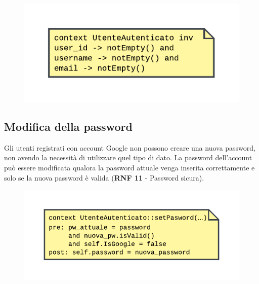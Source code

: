 \documentclass[11pt, a4paper]{article}
\theoremstyle{definition} %
\begin{document}
\begin{figure}[H]
\centering
\includegraphics[scale = 0.9]{materiale/ocl-utenteautenticato.pdf}
\end{figure}

\subsection{Modifica della password}
Gli utenti registrati con account Google non possono creare una nuova
password, non avendo la necessità di utilizzare quel tipo di dato.
La password dell'account può essere modificata qualora la password
attuale venga inserita correttamente e solo se la nuova password
è valida (\textbf{RNF 11} - Password sicura).

\begin{figure}[H]
\centering
\includegraphics[scale = 0.9]{materiale/ocl-newpassword.pdf}
\end{figure}
\end{document}
